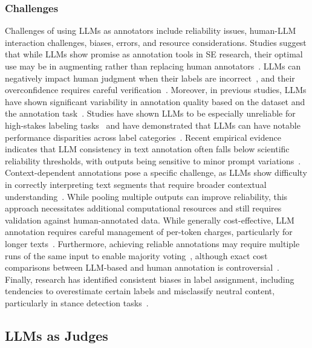 \subsubsection{Challenges}

Challenges of using LLMs as annotators include reliability issues, human-LLM interaction challenges, biases, errors, and resource considerations.
Studies suggest that while LLMs show promise as annotation tools in SE research, their optimal use may be in augmenting rather than replacing human annotators~\cite{DBLP:conf/emnlp/WangLXZZ21, DBLP:conf/chi/HeHDRH24}.
LLMs can negatively impact human judgment when their labels are incorrect~\cite{DBLP:conf/www/HuangKA23a}, and their overconfidence requires careful verification~\cite{DBLP:conf/kdd/WanSJKCNSSWYABJ24}.
Moreover, in previous studies, LLMs have shown significant variability in annotation quality based on the dataset and the annotation task~\cite{DBLP:journals/corr/abs-2306-00176}. Studies have shown LLMs to be especially unreliable for high-stakes labeling tasks~\cite{DBLP:conf/chi/Wang0RMM24} and have demonstrated that LLMs can have notable performance disparities across label categories~\cite{DBLP:journals/corr/abs-2304-10145}. Recent empirical evidence indicates that LLM consistency in text annotation often falls below scientific reliability thresholds, with outputs being sensitive to minor prompt variations~\cite{DBLP:journals/corr/abs-2304-11085}.
Context-dependent annotations pose a specific challenge, as LLMs show difficulty in correctly interpreting text segments that require broader contextual understanding~\cite{DBLP:conf/chi/HeHDRH24}.
While pooling multiple outputs can improve reliability, this approach necessitates additional computational resources and still requires validation against human-annotated data.
While generally cost-effective, LLM annotation requires careful management of per-token charges, particularly for longer texts~\cite{DBLP:conf/emnlp/WangLXZZ21}. Furthermore, achieving reliable annotations may require multiple runs of the same input to enable majority voting~\cite{DBLP:journals/corr/abs-2304-11085}, although exact cost comparisons between LLM-based and human annotation is controversial~\cite{DBLP:conf/chi/HeHDRH24}.
Finally, research has identified consistent biases in label assignment, including tendencies to overestimate certain labels and misclassify neutral content, particularly in stance detection tasks~\cite{DBLP:journals/corr/abs-2304-10145}.


\subsection{LLMs as Judges}
\label{sec:llms-as-judges}


